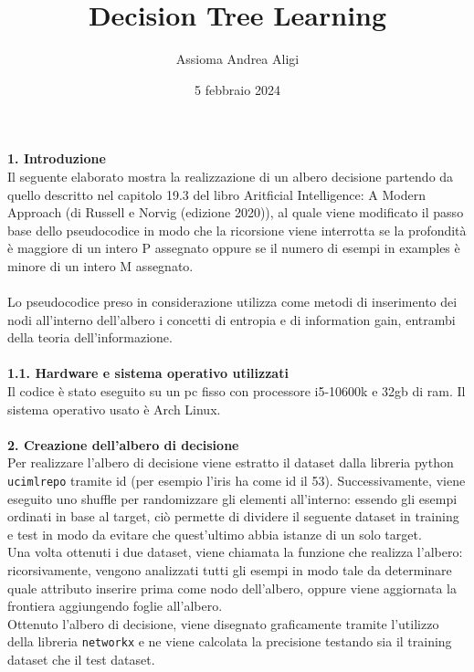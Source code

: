 \documentclass{article}
\begin{document}
\title{\textbf{Decision Tree Learning}}
\author{Assioma Andrea Aligi}
\date{5 febbraio 2024}
\maketitle


{\Large \textbf{1. Introduzione}}\\
Il seguente elaborato mostra la realizzazione di un albero decisione partendo da quello descritto nel capitolo 19.3 del libro Aritficial Intelligence: A Modern Approach  
(di Russell e Norvig (edizione 2020)), al quale viene modificato il passo base dello pseudocodice in modo che la ricorsione viene interrotta se la profondità è maggiore 
di un intero P assegnato oppure se il numero di esempi in examples è minore di un intero M assegnato.\\
\\
Lo pseudocodice preso in considerazione utilizza come metodi di inserimento dei nodi all'interno dell'albero i concetti di entropia e di information gain, entrambi della teoria
dell'informazione.\\
\\
{\Large \textbf{{\large{1}}.{\small{1}}. Hardware e sistema operativo utilizzati}}\\
Il codice è stato eseguito su un pc fisso con processore i5-10600k e 32gb di ram. Il sistema operativo usato è Arch Linux.\\
\\
{\Large \textbf{2. Creazione dell'albero di decisione}}\\
Per realizzare l'albero di decisione viene estratto il dataset dalla libreria python \texttt{ucimlrepo} tramite id (per esempio l'iris ha come id il 53). Successivamente, viene eseguito uno
shuffle per randomizzare gli elementi all'interno: essendo gli esempi ordinati in base al target, ciò permette di dividere il seguente dataset in training e test 
in modo da evitare che quest'ultimo abbia istanze di un solo target.\\
Una volta ottenuti i due dataset, viene chiamata la funzione che realizza l'albero: ricorsivamente, vengono analizzati tutti gli esempi in modo tale da determinare quale attributo
inserire prima come nodo dell'albero, oppure viene aggiornata la frontiera aggiungendo foglie all'albero.\\
Ottenuto l'albero di decisione, viene disegnato graficamente tramite l'utilizzo della libreria \texttt{networkx} e ne viene calcolata la precisione testando sia il training dataset
che il test dataset.\\
\end{document}
